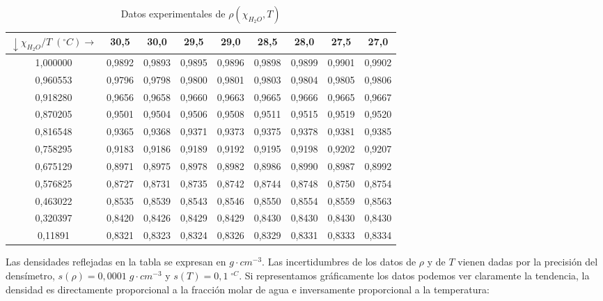 \documentclass[a4paper,12pt,titlepage]{article}
\begin{document}
\begin{table}[h!]
\centering
\begin{tabular}{|c|c|c|c|c|c|c|c|c|}
\hline
$\downarrow \chi_{H_2O} / T\;(^{\circ}C) \rightarrow$ & 30,5   & 30,0   & 29,5   & 29,0   & 28,5   & 28,0   & 27,5   & 27,0   \\ \hline
1,000000                                              & 0,9892 & 0,9893 & 0,9895 & 0,9896 & 0,9898 & 0,9899 & 0,9901 & 0,9902 \\ \hline
0,960553                                              & 0,9796 & 0,9798 & 0,9800 & 0,9801 & 0,9803 & 0,9804 & 0,9805 & 0,9806 \\ \hline
0,918280                                              & 0,9656 & 0,9658 & 0,9660 & 0,9663 & 0,9665 & 0,9666 & 0,9665 & 0,9667 \\ \hline
0,870205                                              & 0,9501 & 0,9504 & 0,9506 & 0,9508 & 0,9511 & 0,9515 & 0,9519 & 0,9520 \\ \hline
0,816548                                              & 0,9365 & 0,9368 & 0,9371 & 0,9373 & 0,9375 & 0,9378 & 0,9381 & 0,9385 \\ \hline
0,758295                                              & 0,9183 & 0,9186 & 0,9189 & 0,9192 & 0,9195 & 0,9198 & 0,9202 & 0,9207 \\ \hline
0,675129                                              & 0,8971 & 0,8975 & 0,8978 & 0,8982 & 0,8986 & 0,8990 & 0,8987 & 0,8992 \\ \hline
0,576825                                              & 0,8727 & 0,8731 & 0,8735 & 0,8742 & 0,8744 & 0,8748 & 0,8750 & 0,8754 \\ \hline
0,463022                                              & 0,8535 & 0,8539 & 0,8543 & 0,8546 & 0,8550 & 0,8554 & 0,8559 & 0,8563 \\ \hline
0,320397                                              & 0,8420 & 0,8426 & 0,8429 & 0,8429 & 0,8430 & 0,8430 & 0,8430 & 0,8430 \\ \hline
0,11891                                               & 0,8321 & 0,8323 & 0,8324 & 0,8326 & 0,8329 & 0,8331 & 0,8333 & 0,8334 \\ \hline
\end{tabular}
\caption{Datos experimentales de $\rho(\chi_{H_2O},T)$}
\label{tab:my-table}
\end{table}

Las densidades reflejadas en la tabla se expresan en $g\cdot cm^{-3}$. Las incertidumbres de los datos de $\rho$ y de $T$ vienen dadas por la precisión del densímetro, $s(\rho)=0,0001\; g\cdot cm^{-3}$ y $s(T)=0,1\; ^{\circ C}$. Si representamos gráficamente los datos podemos ver claramente la tendencia, la densidad es directamente proporcional a la fracción molar de agua e inversamente proporcional a la temperatura:
\end{document}
